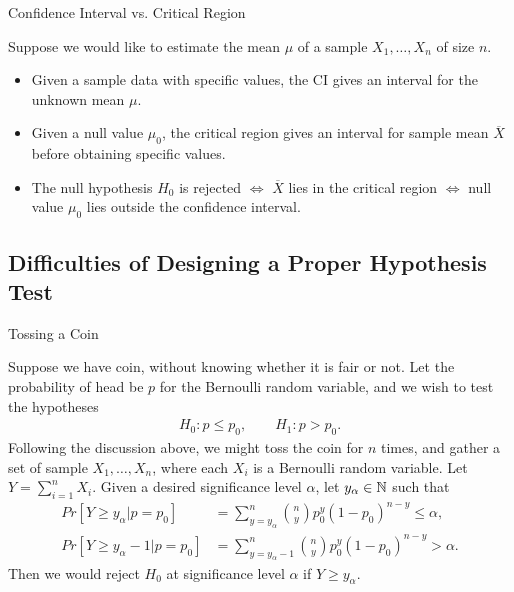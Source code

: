\begin{frame}{Confidence Interval vs. Critical Region}

\justifying
Suppose we would like to estimate the mean $\mu$ of a sample $X_1, \ldots, X_n$ of size $n$.
\begin{itemize}
	\justifying
	\item {} Given a sample data with specific values, the CI gives an interval for the unknown mean $\mu$.
	\item {} Given a null value $\mu_0$, the critical region gives an interval for sample mean $\overline{X}$ before obtaining specific values.
	\item {} The null hypothesis $H_0$ is rejected $\Leftrightarrow$ $\overline{X}$ lies in the critical region $\Leftrightarrow$ null value $\mu_0$ lies outside the confidence interval.
\end{itemize}


\end{frame}


\subsection{Difficulties of Designing a Proper Hypothesis Test}

\begin{frame}{Tossing a Coin}

\justifying
{} Suppose we have coin, without knowing whether it is fair or not. Let the probability of head be $p$ for the Bernoulli random variable, and we wish to test the hypotheses
\begin{align*}
H_0: p \leq p_0, \qquad H_1: p > p_0.
\end{align*}
 Following the discussion above, we might toss the coin for $n$ times, and gather a set of sample $X_1, \ldots, X_n$, where each $X_i$ is a Bernoulli random variable. Let $\displaystyle Y = \sum_{i=1}^n X_i$. Given a desired significance level $\alpha$, let $y_{\alpha} \in \mathbb{N}$ such that
\footnotesize
\begin{align*}
Pr[Y\geq y_{\alpha}|p=p_0] & = \sum_{y=y_{\alpha}}^n \binom{n}{y} p_0^{y}(1-p_0)^{n-y} \leq \alpha, \\
Pr[Y\geq y_{\alpha}-1|p=p_0] & = \sum_{y=y_{\alpha}-1}^n \binom{n}{y} p_0^{y}(1-p_0)^{n-y} > \alpha.
\end{align*}
\normalsize
Then we would reject $H_0$ at significance level $\alpha$ if $Y \geq y_{\alpha}$.

\end{frame}


